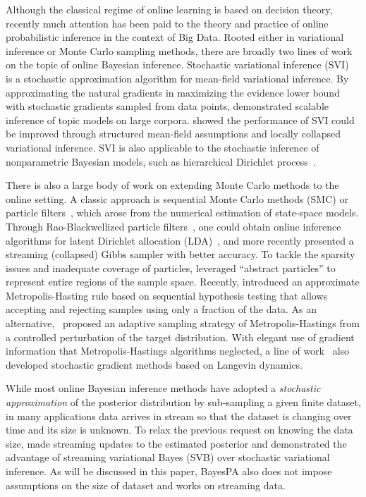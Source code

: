 \documentclass[twoside,11pt]{article}
\begin{document}
Although the classical regime of online learning is based on decision theory, recently much attention has been paid to the theory and practice of online probabilistic inference in the context of Big Data. Rooted either in variational inference or Monte Carlo sampling methods, there are broadly two lines of work on the topic of online Bayesian inference. Stochastic variational inference (SVI)~\citep{hoffman2013stochastic} is a stochastic approximation algorithm for mean-field variational inference. By approximating the natural  gradients in maximizing the evidence lower bound with stochastic gradients sampled from data points, \cite{hoffman2013stochastic} demonstrated scalable inference of topic models on large corpora. \cite{mimno2012sparse} showed the performance of SVI could be improved through structured mean-field assumptions and locally collapsed variational inference. SVI is also applicable to the stochastic inference of nonparametric Bayesian models, such as hierarchical Dirichlet process~\citep{wang2011onlinealgo, wang2012truncation}.

There is also a large body of work on extending Monte Carlo methods to the online setting. A classic approach is sequential Monte Carlo methods (SMC) or particle filters~\citep{doucet2009tutorial}, which arose from the numerical estimation of state-space models. Through Rao-Blackwellized particle filters~\citep{doucet2000rao}, one could obtain online inference algorithms for latent Dirichlet allocation (LDA)~\citep{canini2009online}, and more recently \cite{Gao:arXiv2016} presented a streaming (collapsed) Gibbs sampler with better accuracy. To tackle the sparsity issues and inadequate coverage of particles, \cite{steinhardt2014filtering} leveraged ``abstract particles'' to represent entire regions of the sample space. Recently, \cite{korattikara2014austerity} introduced an approximate Metropolis-Hasting rule based on sequential hypothesis testing that allows accepting and rejecting samples using only a fraction of the data. As an alternative,~\cite{bardenet2014towards} proposed an adaptive sampling strategy of Metropolis-Hastings from a controlled perturbation of the target distribution. With elegant use of gradient information that Metropolis-Hastings algorithms neglected, a line of work~\citep{welling2011bayesian, welling2012mc, patterson2013stochastic} also developed stochastic gradient methods based on Langevin dynamics.

While most online Bayesian inference methods have adopted a \emph{stochastic approximation} of the posterior distribution by sub-sampling a given finite dataset, in many applications data arrives in stream so that the dataset is changing over time and its size is unknown. To relax the previous request on knowing the data size, \cite{broderick2013streaming} made streaming updates to the estimated posterior and demonstrated the advantage of streaming variational Bayes (SVB) over stochastic variational inference. As will be discussed in this paper, BayesPA also does not impose assumptions on the size of dataset and works on streaming data.
\end{document}

